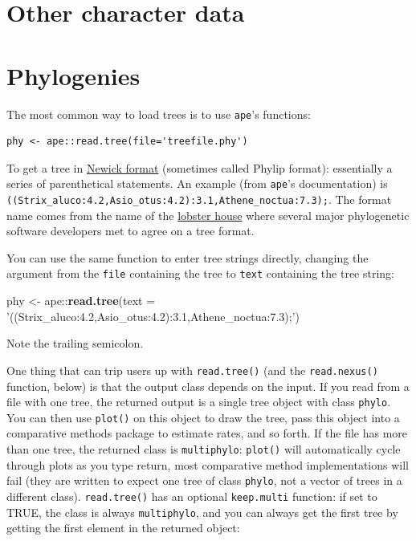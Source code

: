 \documentclass[]{book}
\newenvironment{Shaded}{\begin{snugshade}}{\end{snugshade}}
\newcommand{\KeywordTok}[1]{\textcolor[rgb]{0.13,0.29,0.53}{\textbf{{#1}}}}
\newcommand{\DataTypeTok}[1]{\textcolor[rgb]{0.13,0.29,0.53}{{#1}}}
\newcommand{\StringTok}[1]{\textcolor[rgb]{0.31,0.60,0.02}{{#1}}}
\newcommand{\NormalTok}[1]{{#1}}
\theoremstyle{definition}
\theoremstyle{definition}
\theoremstyle{remark}
\begin{document}
\section{Other character data}\label{other-character-data}

\section{Phylogenies}\label{phylogenies}

The most common way to load trees is to use \texttt{ape}'s functions:

\begin{verbatim}
phy <- ape::read.tree(file='treefile.phy')
\end{verbatim}

To get a tree in
\href{http://evolution.genetics.washington.edu/phylip/newicktree.html}{Newick
format} (sometimes called Phylip format): essentially a series of
parenthetical statements. An example (from \texttt{ape}'s documentation)
is \texttt{((Strix\_aluco:4.2,Asio\_otus:4.2):3.1,Athene\_noctua:7.3);}.
The format name comes from the name of the
\href{http://newicks.com}{lobster house} where several major
phylogenetic software developers met to agree on a tree format.

You can use the same function to enter tree strings directly, changing
the argument from the \texttt{file} containing the tree to \texttt{text}
containing the tree string:

\begin{Shaded}
\begin{Highlighting}[]
\NormalTok{phy <-}\StringTok{ }\NormalTok{ape::}\KeywordTok{read.tree}\NormalTok{(}\DataTypeTok{text =} \StringTok{'((Strix_aluco:4.2,Asio_otus:4.2):3.1,Athene_noctua:7.3);'}\NormalTok{)}
\end{Highlighting}
\end{Shaded}

Note the trailing semicolon.

One thing that can trip users up with \texttt{read.tree()} (and the
\texttt{read.nexus()} function, below) is that the output class depends
on the input. If you read from a file with one tree, the returned output
is a single tree object with class \texttt{phylo}. You can then use
\texttt{plot()} on this object to draw the tree, pass this object into a
comparative methods package to estimate rates, and so forth. If the file
has more than one tree, the returned class is \texttt{multiphylo}:
\texttt{plot()} will automatically cycle through plots as you type
return, most comparative method implementations will fail (they are
written to expect one tree of class \texttt{phylo}, not a vector of
trees in a different class). \texttt{read.tree()} has an optional
\texttt{keep.multi} function: if set to TRUE, the class is always
\texttt{multiphylo}, and you can always get the first tree by getting
the first element in the returned object:
\end{document}
